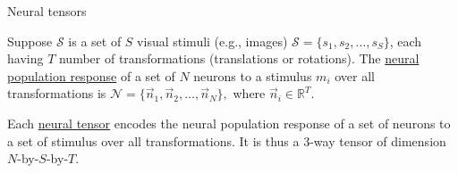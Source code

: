 \documentclass[xcolor={dvipsnames,svgnames}]{beamer}
\begin{document}
\begin{frame}{Neural tensors}
\begin{defn}
    Suppose $\mathcal{S}$ is a set of $S$ visual stimuli (e.g., images) $\mathcal{S} = \{s_1, s_2,\dots, s_S\}$, each having $T$ number of transformations (translations or rotations). The \underline{neural population response} of a set of $N$ neurons to a stimulus $m_i$ over all transformations is $\mathcal{N} = \{\vec{n}_1, \vec{n}_2, \dots, \vec{n}_N\},$ where $\vec{n}_i \in \mathbb{R}^T$. 
\end{defn}
\begin{defn}
    Each \underline{neural tensor} encodes the neural population response of a set of neurons to a set of stimulus over all transformations. It is thus a $3$-way tensor of dimension $N$-by-$S$-by-$T$.
    
\end{defn} 
\end{frame}
\end{document}
